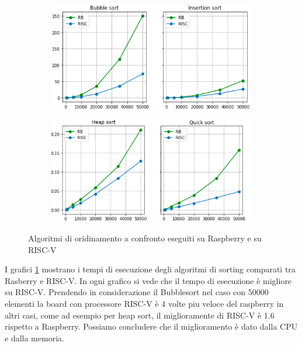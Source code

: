 \documentclass[12pt,a4paper]{report}
\begin{document}
\begin{figure}[htbp]
     \centering
     \begin{subfigure}[t]{0.49\textwidth}
         \centering
         \includegraphics[width=\textwidth]{Img/GraficiSorting/BISort_RB.png}
        
     \end{subfigure}
     \hfill
     \begin{subfigure}[t]{0.49\textwidth}
         \centering
         \includegraphics[width=\textwidth]{Img/GraficiSorting/HQSort_RB.png}
         
     \end{subfigure}

   \caption{Algoritmi di oridinamento a confronto eseguiti su Raspberry e su RISC-V}
   \label{Fig:AllSort_RB}
\end{figure}

I grafici \ref{Fig:AllSort_RB} mostrano i tempi di esecuzione degli algoritmi di sorting comparati tra Rasberry e RISC-V. In ogni grafico si vede che il tempo di esecuzione è migliore su RISC-V. Prendendo in considerazione il Bubblesort nel caso con 50000 elementi la board con processore RISC-V è 4 volte piu veloce del raspberry in altri casi, come ad esempio per heap sort, il miglioramente di RISC-V è 1.6 rispetto a Raspberry. Possiamo concludere che il miglioramento è dato dalla CPU e dalla memoria.  
\end{document}
